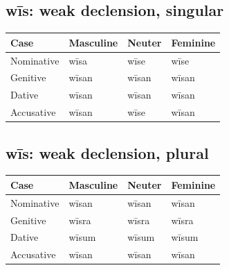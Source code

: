 \subsection*{wīs: weak declension, singular}

\par\begingroup
\fontsize{10.5}{13.2}\selectfont
\setlength{\LTleft}{0pt}\setlength{\LTright}{\fill}
\noindent
\begin{tabular}{@{}>{\raggedright\arraybackslash}p{28.89mm}>{\raggedright\arraybackslash}p{28.89mm}>{\raggedright\arraybackslash}p{28.89mm}>{\raggedright\arraybackslash}p{28.89mm}@{}}
\toprule
\textbf{Case} & \textbf{Masculine} & \textbf{Neuter} & \textbf{Feminine} \\
\midrule
Nominative & wīsa & wīse & wīse \\
Genitive & wīsan & wīsan & wīsan \\
Dative & wīsan & wīsan & wīsan \\
Accusative & wīsan & wīse & wīsan \\
\bottomrule
\end{tabular}
\par\endgroup

\subsection*{wīs: weak declension, plural}

\par\begingroup
\fontsize{10.5}{13.2}\selectfont
\setlength{\LTleft}{0pt}\setlength{\LTright}{\fill}
\noindent
\begin{tabular}{@{}>{\raggedright\arraybackslash}p{28.89mm}>{\raggedright\arraybackslash}p{28.89mm}>{\raggedright\arraybackslash}p{28.89mm}>{\raggedright\arraybackslash}p{28.89mm}@{}}
\toprule
\textbf{Case} & \textbf{Masculine} & \textbf{Neuter} & \textbf{Feminine} \\
\midrule
Nominative & wīsan & wīsan & wīsan \\
Genitive & wīsra & wīsra & wīsra \\
Dative & wīsum & wīsum & wīsum \\
Accusative & wīsan & wīsan & wīsan \\
\bottomrule
\end{tabular}
\par\endgroup

